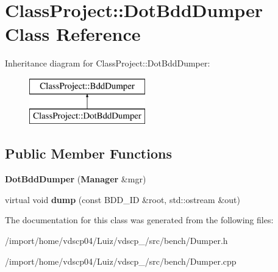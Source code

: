 \section{Class\+Project\+:\+:Dot\+Bdd\+Dumper Class Reference}
\label{classClassProject_1_1DotBddDumper}
Inheritance diagram for Class\+Project\+:\+:Dot\+Bdd\+Dumper\+:\begin{figure}[H]
\begin{center}
\leavevmode
\includegraphics[height=2.000000cm]{classClassProject_1_1DotBddDumper}
\end{center}
\end{figure}
\subsection*{Public Member Functions}
\begin{DoxyCompactItemize}
\item 
{\bfseries Dot\+Bdd\+Dumper} ({\bf Manager} \&mgr)\label{classClassProject_1_1DotBddDumper_ae6ea6f970ccdff61558df2e2d5d71591}

\item 
virtual void {\bfseries dump} (const B\+D\+D\+\_\+\+ID \&root, std\+::ostream \&out)\label{classClassProject_1_1DotBddDumper_abcef13e93836b3827e1903a6ad6bed00}

\end{DoxyCompactItemize}


The documentation for this class was generated from the following files\+:\begin{DoxyCompactItemize}
\item 
/import/home/vdscp04/\+Luiz/vdscp\+\_/src/bench/Dumper.\+h\item 
/import/home/vdscp04/\+Luiz/vdscp\+\_/src/bench/Dumper.\+cpp\end{DoxyCompactItemize}
